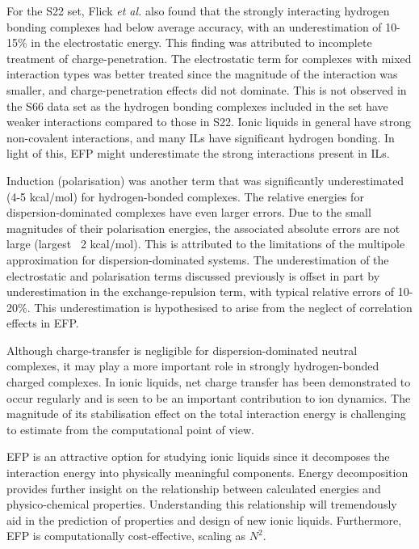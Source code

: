For the S22 set, Flick \emph{et al.} also found that the strongly interacting hydrogen bonding complexes had below average accuracy, with an underestimation of 10-15\% in the electrostatic energy. 
\cite{Flick2012a}
This finding was attributed to incomplete treatment of charge-penetration.
The electrostatic term for complexes with mixed interaction types was better treated since the magnitude of the interaction was smaller, and charge-penetration effects did not dominate.
This is not observed in the S66 data set as the hydrogen bonding complexes included in the set have weaker interactions compared to those in S22.
Ionic liquids in general have strong non-covalent interactions, and many ILs have significant hydrogen bonding.
In light of this, EFP might underestimate the strong interactions present in ILs.


Induction (polarisation) was another term that was significantly underestimated (4-5 kcal/mol) for hydrogen-bonded complexes.
\cite{Flick2012a}
The relative energies for dispersion-dominated complexes have even larger errors. 
Due to the small magnitudes of their polarisation energies, the associated absolute errors are not large (largest ~2 kcal/mol).
This is attributed to the limitations of the multipole approximation for dispersion-dominated systems. 
The underestimation of the electrostatic and polarisation terms discussed previously is offset in part by underestimation in the exchange-repulsion term, with typical relative errors of 10-20\%. 
This underestimation is hypothesised to arise from the neglect of correlation effects in EFP.

Although charge-transfer is negligible for dispersion-dominated neutral complexes, it may play a more important role in strongly hydrogen-bonded charged complexes.
In ionic liquids, net charge transfer has been demonstrated to occur regularly and is seen to be an important contribution to ion dynamics. 
\cite{Izgorodina2011a} 
The magnitude of its stabilisation effect on the total interaction energy is challenging to estimate from the computational point of view.


EFP is an attractive option for studying ionic liquids since it decomposes the interaction energy into physically meaningful components.
Energy decomposition provides further insight on the relationship between calculated energies and physico-chemical properties.
\cite{Izgorodina2014a}
Understanding this relationship will tremendously aid in the prediction of properties and design of new ionic liquids.
Furthermore, EFP is computationally cost-effective, scaling as $N^2$.
\cite{Flick2012a}


